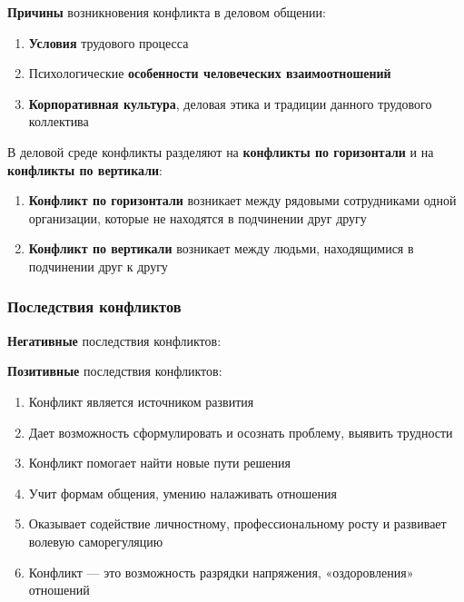 \documentclass{article}
\begin{document}
\textbf{Причины} возникновения конфликта в деловом общении:

\begin{enumerate}
    \item \textbf{Условия} трудового процесса
    \item Психологические \textbf{особенности человеческих взаимоотношений}
    \item \textbf{Корпоративная культура}, деловая этика и традиции данного трудового коллектива
\end{enumerate}

В деловой среде конфликты разделяют на \textbf{конфликты по горизонтали} и на \textbf{конфликты по вертикали}:

\begin{enumerate}
    \item \textbf{Конфликт по горизонтали} возникает между рядовыми сотрудниками одной организации, которые не находятся в подчинении друг другу
    \item \textbf{Конфликт по вертикали} возникает между людьми, находящимися в подчинении друг к другу
\end{enumerate}

\subsubsection{Последствия конфликтов}

\textbf{Негативные} последствия конфликтов:

\begin{multienumerate}
\end{multienumerate}

\textbf{Позитивные} последствия конфликтов:

\begin{enumerate}
    \item Конфликт является источником развития
    \item Дает возможность сформулировать и осознать проблему, выявить трудности
    \item Конфликт помогает найти новые пути решения
    \item Учит формам общения, умению налаживать отношения
    \item Оказывает содействие личностному, профессиональному росту и развивает волевую саморегуляцию
    \item Конфликт — это возможность разрядки напряжения, «оздоровления» отношений
\end{enumerate}
\end{document}
